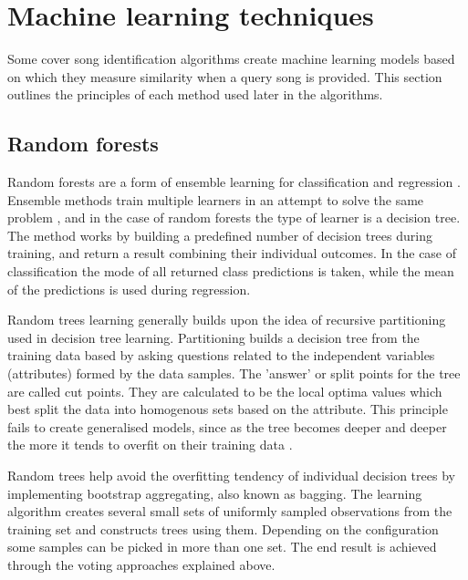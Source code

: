 \section{Machine learning techniques}
\label{sec:machinelearning}
Some cover song identification algorithms create machine learning models based
on which they measure similarity when a query song is provided. This section
outlines the principles of each method used later in the algorithms.

\subsection{Random forests}
\label{subsec:randomforests}
Random forests are a form of ensemble learning for classification and regression
\cite{ho1995random}. Ensemble methods train multiple learners in an attempt to
solve the same problem \cite{zhou2012ensemble}, and in the case of random
forests the type of learner is a decision tree. The method works by building a
predefined number of decision trees during training, and return a result
combining their individual outcomes. In the case of classification the mode of
all returned class predictions is taken, while the mean of the predictions is
used during regression. 

Random trees learning generally builds upon the idea of recursive partitioning
used in decision tree learning. Partitioning builds a decision tree from the
training data based by asking questions related to the independent variables
(attributes) formed by the data samples. The 'answer' or split points for the
tree are called cut points. They are calculated to be the local optima values
which best split the data into homogenous sets based on the attribute. This
principle fails to create generalised models, since as the tree becomes deeper
and deeper the more it tends to overfit on their training data
\cite{friedman2001elements}.

Random trees help avoid the overfitting tendency of individual decision trees by
implementing bootstrap aggregating, also known as bagging. The learning
algorithm creates several small sets of uniformly sampled observations from the
training set and constructs trees using them. Depending on the configuration
some samples can be picked in more than one set. The end result is achieved
through the voting approaches explained above.

